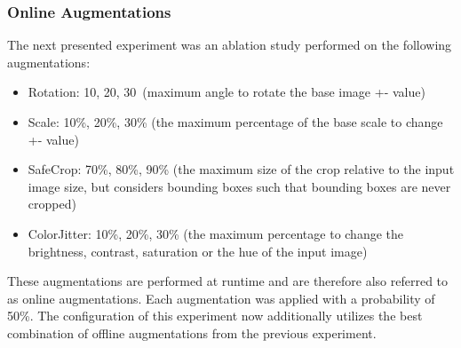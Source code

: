 \subsubsection{Online Augmentations}

The next presented experiment was an ablation study performed on the following augmentations:
\begin{itemize}
    \item Rotation: 10\textdegree, 20\textdegree, 30\textdegree\ (maximum angle to rotate the base image +- value)
    \item Scale: 10\%, 20\%, 30\% (the maximum percentage of the base scale to change +- value)
    \item SafeCrop: 70\%, 80\%, 90\% (the maximum size of the crop relative to the input image size, but considers bounding boxes such that bounding boxes are never cropped)
    \item ColorJitter: 10\%, 20\%, 30\% (the maximum percentage to change the brightness, contrast, saturation or the hue of the input image)
\end{itemize}
These augmentations are performed at runtime and are therefore also referred to as  online augmentations.
Each augmentation was applied with a probability of 50\%.
The configuration of this experiment now additionally utilizes the best combination of offline augmentations from the previous experiment.




